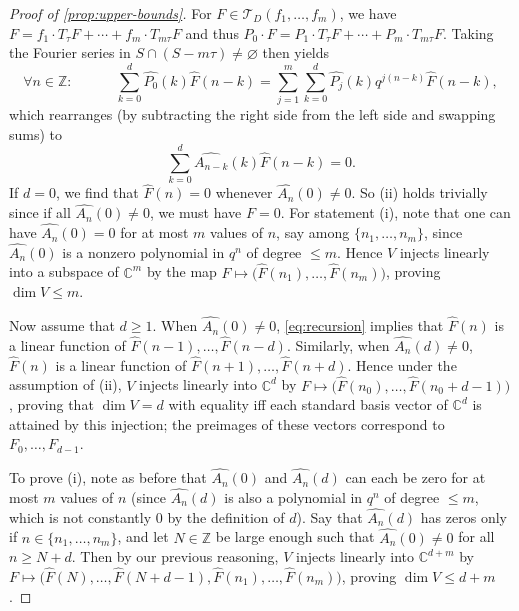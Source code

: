 \documentclass[reqno,11pt]{amsart}
\theoremstyle{definition}
\theoremstyle{remark}
\numberwithin{equation}{section}
\newcommand{\Z}{\mathbb{Z}}
\newcommand{\C}{\mathbb{C}}
\newcommand{\mT}{\mathcal{T}}
\renewcommand{\hat}{\widehat}
\renewcommand{\emptyset}{\varnothing}
\begin{document}
\begin{proof}[Proof of \cref{prop:upper-bounds}]
For $F \in \mT_D(f_1, \ldots, f_m)$, we have $F = f_1 \cdot T_\tau F + \cdots + f_m \cdot T_{m\tau} F$ and thus $P_0 \cdot F = P_1 \cdot T_\tau F + \cdots + P_m \cdot T_{m\tau} F$. Taking the Fourier series in $S \cap (S - m\tau) \neq \emptyset$ then yields 
\[
    \forall n \in \Z : \qquad\quad \sum_{k=0}^d \hat{P_0}(k) \hat{F}(n-k)
    =
    \sum_{j=1}^m \sum_{k=0}^d \hat{P_j}(k) q^{j(n-k)} \hat{F}(n-k),
\]
which rearranges (by subtracting the right side from the left side and swapping sums) to
\begin{equation}\label{eq:recursion}
    \sum_{k=0}^d \hat{A_{n-k}}(k) \hat{F}(n-k) = 0.
\end{equation}
If $d = 0$, we find that $\hat{F}(n) = 0$ whenever $\hat{A_n}(0) \neq 0$. So (ii) holds trivially since if all $\hat{A_n}(0) \neq 0$, we must have $F = 0$. For statement (i), note that one can have $\hat{A_n}(0) = 0$ for at most $m$ values of $n$, say among $\{n_1, \ldots, n_m\}$, since $\hat{A_n}(0)$ is a nonzero polynomial in $q^n$ of degree $\le m$. Hence $V$ injects linearly into a subspace of $\C^m$ by the map $F \mapsto \big(\hat{F}(n_1), \ldots, \hat{F}(n_m) \big)$, proving $\dim V \le m$.

Now assume that $d \ge 1$. When $\hat{A_n}(0) \neq 0$, \cref{eq:recursion} implies that $\hat{F}(n)$ is a linear function of $\hat{F}(n-1), \ldots, \hat{F}(n-d)$. Similarly, when $\hat{A_n}(d) \neq 0$, $\hat{F}(n)$ is a linear function of $\hat{F}(n+1), \ldots, \hat{F}(n+d)$. Hence under the assumption of (ii), $V$ injects linearly into $\C^d$ by $F \mapsto \big(\hat{F}(n_0), \ldots, \hat{F}(n_0 + d-1)\big)$, proving that $\dim V = d$ with equality iff each standard basis vector of $\C^d$ is attained by this injection; the preimages of these vectors correspond to $F_0, \ldots, F_{d-1}$.

To prove (i), note as before that $\hat{A_n}(0)$ and $\hat{A_n}(d)$ can each be zero for at most $m$ values of $n$ (since $\hat{A_n}(d)$ is also a polynomial in $q^n$ of degree $\le m$, which is not constantly $0$ by the definition of $d$). Say that $\hat{A_n}(d)$ has zeros only if $n \in \{n_1, \ldots, n_m\}$, and let $N \in \Z$ be large enough such that $\hat{A_n}(0) \neq 0$ for all $n \ge N+d$. Then by our previous reasoning, $V$ injects linearly into $\C^{d+m}$ by $F \mapsto \big(\hat{F}(N), \ldots, \hat{F}(N+d-1), \hat{F}(n_1), \ldots, \hat{F}(n_m) \big)$, proving $\dim V \le d + m$.
\end{proof}
\end{document}
